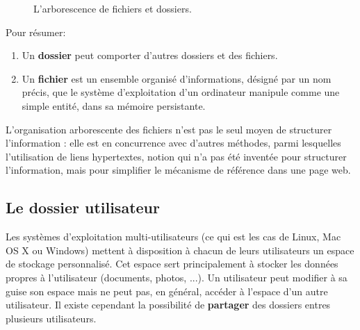 \begin{figure}[!h]
	\centering
	\hspace{1cm}
	\caption{L'arborescence de fichiers et dossiers.}
\end{figure}\label{CourbeRepr}
Pour résumer: 
\begin{enumerate}
	\item Un {\bf dossier} peut comporter d’autres dossiers et des fichiers.
	\item Un {\bf fichier} est un ensemble organisé d'informations, désigné par un nom précis, que le système d'exploitation d'un ordinateur manipule comme une simple entité, dans sa mémoire persistante.
\end{enumerate}
L’organisation arborescente des fichiers n’est pas le seul moyen de structurer l’information : elle est en concurrence avec d’autres méthodes, parmi lesquelles l’utilisation de liens hypertextes, notion qui n’a pas été inventée pour structurer l’information, mais pour simplifier le mécanisme de référence dans une page web.

\subsection{Le dossier utilisateur}
Les systèmes d'exploitation multi-utilisateurs (ce qui est les cas de Linux, Mac OS X ou Windows) mettent à disposition à chacun de leurs utilisateurs un espace de stockage personnalisé. Cet espace sert principalement à stocker les données propres à l'utilisateur (documents, photos, ...). Un utilisateur peut modifier à sa guise son espace mais ne peut pas, en général, accéder à l'espace d'un autre utilisateur. Il existe cependant la possibilité de \textbf{partager} des dossiers entres plusieurs utilisateurs.

